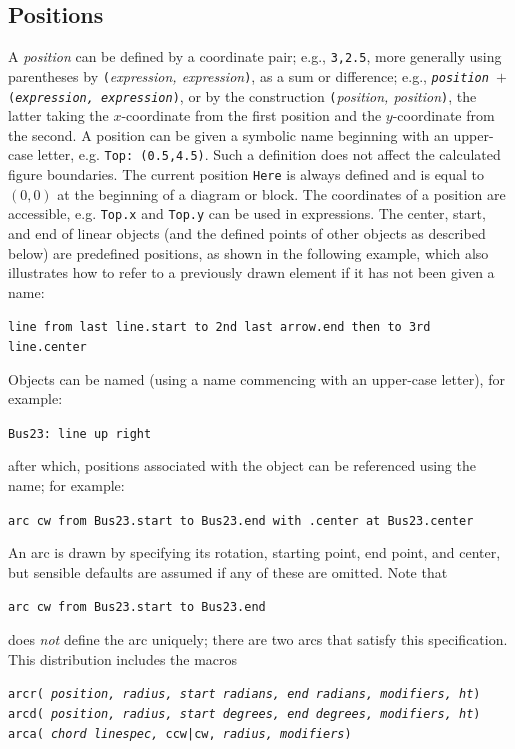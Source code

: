 \subsection{Positions\label{Positions:}}
A {\sl position} can be defined by a coordinate pair;
 e.g., {\tt 3,2.5},
more generally using parentheses by {\tt (}{\sl expression, expression}{\tt )},
as a sum or difference;
 e.g., {\tt{\sl position} $+$ ({\sl expression, expression})},
or by the construction {\tt (}{\sl position, position}{\tt )},
the latter taking the $x$-coordinate from the first
position and the $y$-coordinate from the second.  A position can be
given a symbolic name beginning with an upper-case letter,
e.g. {\tt Top:~(0.5,4.5)}.  Such a definition does not affect the calculated
figure boundaries.  The current position {\tt Here} is always defined and
is equal to $(0,0)$ at the beginning of a diagram or block.
The coordinates of a position are accessible, e.g. {\tt Top.x} and
{\tt Top.y} can be used in expressions.  The center, start, and end of
linear objects (and the defined points of other objects as described below)
are predefined positions, as shown in the following example,
which also illustrates how to refer to a previously drawn element if it has
not been given a name:

{\tt line from last line.start to 2nd last arrow.end then to 3rd line.center}

Objects can be named (using a name commencing with an upper-case letter),
for example:

{\tt Bus23: line up right}

\noindent
after which, positions associated with the object can be referenced using the
name; for example:

{\tt arc cw from Bus23.start to Bus23.end with .center at Bus23.center}

An arc is drawn by specifying its rotation, starting point, end point, and
center, but sensible defaults are assumed if any of these are omitted.
Note that

{\tt arc cw from Bus23.start to Bus23.end}

\noindent
does {\em not} define the arc uniquely; there are two arcs that satisfy this
specification.
This distribution includes the \Mfour macros

{\tt arcr( {\sl position, radius, start radians, end radians, modifiers, ht})
\hfill\break\indent
     arcd( {\sl position, radius, start degrees, end degrees, modifiers, ht})
\hfill\break\indent
     arca( {\sl chord linespec,} ccw|cw, {\sl radius, modifiers})
}

